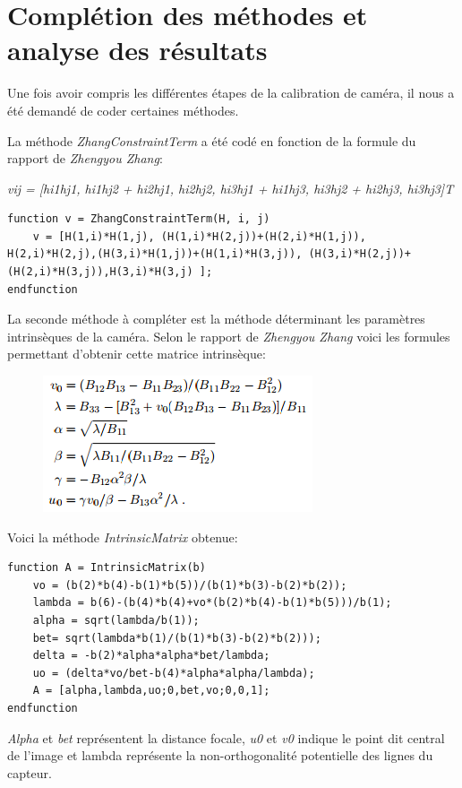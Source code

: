 \documentclass[a4paper,12pt]{report}
\begin{document}
\section*{Complétion des méthodes et analyse des résultats}

Une fois avoir compris les différentes étapes de la calibration de caméra, il nous a été demandé de coder certaines méthodes.

La méthode \textit{ZhangConstraintTerm} a été codé en fonction de la formule du rapport de \textit{Zhengyou Zhang}: 

\textit{vij = [hi1hj1, hi1hj2 + hi2hj1, hi2hj2, hi3hj1 + hi1hj3, hi3hj2 + hi2hj3, hi3hj3]T}


\begin{lstlisting}[style=Scilab]
function v = ZhangConstraintTerm(H, i, j)
    v = [H(1,i)*H(1,j), (H(1,i)*H(2,j))+(H(2,i)*H(1,j)), H(2,i)*H(2,j),(H(3,i)*H(1,j))+(H(1,i)*H(3,j)), (H(3,i)*H(2,j))+(H(2,i)*H(3,j)),H(3,i)*H(3,j) ];
endfunction
\end{lstlisting}


La seconde méthode à compléter est la méthode déterminant les paramètres intrinsèques de la caméra. Selon le rapport de \textit{Zhengyou Zhang} voici les formules permettant d'obtenir cette matrice intrinsèque:

\begin{figure}[!ht]
	\center
	\includegraphics[scale=1]{./image/intrinsequeForm.png}
\end{figure}

Voici la méthode \textit{IntrinsicMatrix} obtenue: 

\begin{lstlisting}[style=Scilab]
function A = IntrinsicMatrix(b)
    vo = (b(2)*b(4)-b(1)*b(5))/(b(1)*b(3)-b(2)*b(2));
    lambda = b(6)-(b(4)*b(4)+vo*(b(2)*b(4)-b(1)*b(5)))/b(1);
    alpha = sqrt(lambda/b(1));
    bet= sqrt(lambda*b(1)/(b(1)*b(3)-b(2)*b(2)));
    delta = -b(2)*alpha*alpha*bet/lambda;
    uo = (delta*vo/bet-b(4)*alpha*alpha/lambda);
    A = [alpha,lambda,uo;0,bet,vo;0,0,1];
endfunction
\end{lstlisting}
\textit{Alpha} et \textit{bet} représentent la distance focale, \textit{u0} et \textit{v0} indique le point dit central de l'image et lambda représente la non-orthogonalité potentielle des lignes du capteur.
\end{document}
